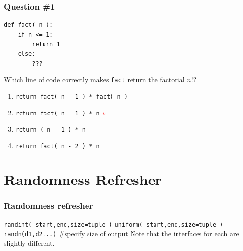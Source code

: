 \documentclass[11pt]{beamer}
\newcommand{\correctstar}{\textcolor{red}{$\star$}}
\begin{document}
\begin{frame}[fragile]
  \frametitle{Question \#1}

  \begin{Verbatim}
def fact( n ):
    if n <= 1:
        return 1
    else:
        ???
  \end{Verbatim}

Which line of code correctly makes \texttt{fact} return the factorial $n!$?

  \begin{enumerate}[label=\Alph*]
    \item  \texttt{return fact( n - 1 ) * fact( n )}
    \item  \texttt{return fact( n - 1 ) * n}  \correctstar
    \item  \texttt{return ( n - 1 ) * n}
    \item  \texttt{return fact( n - 2 ) * n}
  \end{enumerate}
\end{frame}

\fi
\section{Randomness Refresher}

\begin{frame}[fragile]
  \frametitle{Randomness refresher}
  \Enlarge

  \begin{enumerate}
  \myitem  \texttt{randint( start,end,size=tuple )} %
  \myitem  \texttt{uniform( start,end,size=tuple )} %
  \myitem  \texttt{randn(d1,d2,..)}    \#specify size of output %
  \mysubitem  Note that the interfaces for each are slightly different.
  \end{enumerate}
\end{frame}
\end{document}
